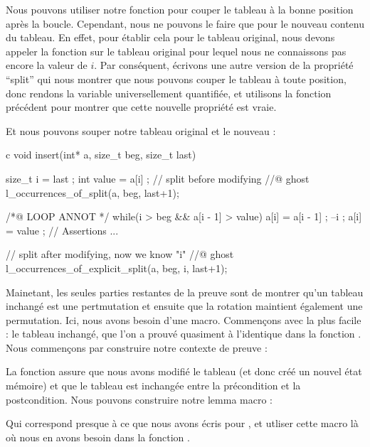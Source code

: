 Nous pouvons utiliser notre fonction pour couper le tableau à la bonne position
après la boucle. Cependant, nous ne pouvons le faire que pour le nouveau contenu
du tableau. En effet, pour établir cela pour le tableau original, nous devons 
appeler la fonction sur le tableau original pour lequel nous ne connaissons pas
encore la valeur de $i$. Par conséquent, écrivons une autre version de la 
propriété ``split'' qui nous montrer que nous pouvons couper le tableau à toute
position, donc rendons la variable  universellement quantifiée,
et utilisons la fonction précédent pour montrer que cette nouvelle propriété est
vraie.




Et nous pouvons souper notre tableau original et le nouveau :


\begin{CodeBlock}{c}
void insert(int* a, size_t beg, size_t last){
  size_t i = last ;
  int value = a[i] ;
  // split before modifying
  //@ ghost l_occurrences_of_split(a, beg, last+1);

  /*@ LOOP ANNOT */
  while(i > beg && a[i - 1] > value){
    a[i] = a[i - 1] ;
    --i ;
  }
  a[i] = value ;
  // Assertions ...

  // split after modifying, now we know "i"
  //@ ghost l_occurrences_of_explicit_split(a, beg, i, last+1);
}
\end{CodeBlock}


Mainetant, les seules parties restantes de la preuve sont de montrer qu'un tableau
inchangé est une pertmutation et ensuite que la rotation maintient également une
permutation. Ici, nous avons besoin d'une macro. Commençons avec la plus facile :
le tableau inchangé, que l'on a prouvé quasiment à l'identique dans la fonction
. Nous commençons par construire notre contexte de
preuve :




La fonction  assure que nous avons 
modifié le tableau (et donc créé un nouvel état mémoire) et que le tableau est
inchangée entre la précondition et la postcondition. Nous pouvons construire 
notre lemma macro :




Qui correspond presque à ce que nous avons écris pour ,
et utliser cette macro là où nous en avons besoin dans la fonction
.


